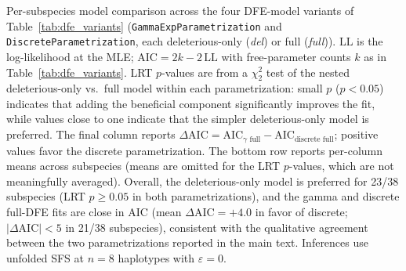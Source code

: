 \begin{table}[H]
    \caption{Per-subspecies model comparison across the four DFE-model variants of Table~\ref{tab:dfe_variants} (\texttt{GammaExpParametrization} and \texttt{DiscreteParametrization}, each deleterious-only (\emph{del}) or full (\emph{full})). $\mathrm{LL}$ is the log-likelihood at the MLE; $\mathrm{AIC} = 2k - 2\,\mathrm{LL}$ with free-parameter counts $k$ as in Table~\ref{tab:dfe_variants}. LRT $p$-values are from a $\chi^2_2$ test of the nested deleterious-only vs.\ full model within each parametrization: small $p$ ($p < 0.05$) indicates that adding the beneficial component significantly improves the fit, while values close to one indicate that the simpler deleterious-only model is preferred. The final column reports $\Delta\mathrm{AIC} = \mathrm{AIC}_{\text{$\gamma$ full}} - \mathrm{AIC}_{\text{discrete full}}$; positive values favor the discrete parametrization. The bottom row reports per-column means across subspecies (means are omitted for the LRT $p$-values, which are not meaningfully averaged). Overall, the deleterious-only model is preferred for 23/38 subspecies (LRT $p \geq 0.05$ in both parametrizations), and the gamma and discrete full-DFE fits are close in AIC (mean $\Delta\mathrm{AIC} = +4.0$ in favor of discrete; $|\Delta\mathrm{AIC}| < 5$ in 21/38 subspecies), consistent with the qualitative agreement between the two parametrizations reported in the main text. Inferences use unfolded SFS at $n=8$ haplotypes with $\varepsilon = 0$.}
    \label{tab:model_comparison}
\end{table}
